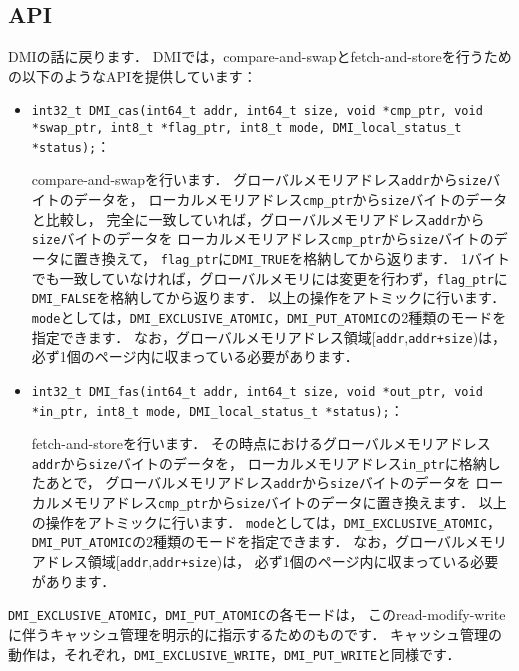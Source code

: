 \documentclass[report,12pt]{jsbook}
\begin{document}
\subsection{API}

DMIの話に戻ります．
DMIでは，compare-and-swapとfetch-and-storeを行うための以下のようなAPIを提供しています：
\begin{itemize}
\item \texttt{int32\_t DMI\_cas(int64\_t addr, int64\_t size, void *cmp\_ptr, void *swap\_ptr, int8\_t *flag\_ptr, int8\_t mode, DMI\_local\_status\_t *status);}：
  
  compare-and-swapを行います．
  グローバルメモリアドレス\texttt{addr}から\texttt{size}バイトのデータを，
  ローカルメモリアドレス\texttt{cmp\_ptr}から\texttt{size}バイトのデータと比較し，
  完全に一致していれば，グローバルメモリアドレス\texttt{addr}から\texttt{size}バイトのデータを
  ローカルメモリアドレス\texttt{cmp\_ptr}から\texttt{size}バイトのデータに置き換えて，
  \texttt{flag\_ptr}に\texttt{DMI\_TRUE}を格納してから返ります．
  1バイトでも一致していなければ，グローバルメモリには変更を行わず，\texttt{flag\_ptr}に\texttt{DMI\_FALSE}を格納してから返ります．
  以上の操作をアトミックに行います．
  \texttt{mode}としては，\texttt{DMI\_EXCLUSIVE\_ATOMIC}，\texttt{DMI\_PUT\_ATOMIC}の2種類のモードを指定できます．
  なお，グローバルメモリアドレス領域[\texttt{addr},\texttt{addr+size})は，
  必ず1個のページ内に収まっている必要があります．
\item \texttt{int32\_t DMI\_fas(int64\_t addr, int64\_t size, void *out\_ptr, void *in\_ptr, int8\_t mode, DMI\_local\_status\_t *status);}：
  
  fetch-and-storeを行います．
  その時点におけるグローバルメモリアドレス\texttt{addr}から\texttt{size}バイトのデータを，
  ローカルメモリアドレス\texttt{in\_ptr}に格納したあとで，
  グローバルメモリアドレス\texttt{addr}から\texttt{size}バイトのデータを
  ローカルメモリアドレス\texttt{cmp\_ptr}から\texttt{size}バイトのデータに置き換えます．
  以上の操作をアトミックに行います．
  \texttt{mode}としては，\texttt{DMI\_EXCLUSIVE\_ATOMIC}，\texttt{DMI\_PUT\_ATOMIC}の2種類のモードを指定できます．
  なお，グローバルメモリアドレス領域[\texttt{addr},\texttt{addr+size})は，
  必ず1個のページ内に収まっている必要があります．
\end{itemize}

\texttt{DMI\_EXCLUSIVE\_ATOMIC}，\texttt{DMI\_PUT\_ATOMIC}の各モードは，
このread-modify-writeに伴うキャッシュ管理を明示的に指示するためのものです．
キャッシュ管理の動作は，それぞれ，\texttt{DMI\_EXCLUSIVE\_WRITE}，\texttt{DMI\_PUT\_WRITE}と同様です．
\end{document}
